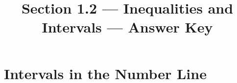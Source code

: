 

\title{Section 1.2 --- Inequalities and Intervals --- Answer Key}

\newcommand{\sets}{\ensuremath{\mathbb{N}\quad\mathbb{Z}\quad\mathbb{Q}\quad\mathbb{R}}}
\newcommand{\picksets}[1]{$#1\hfill\sets\qquad$}


\maketitle

\section*{Intervals in the Number Line}
\begin{senum}
\item {}
\item \twopartans{$-4\leq x<4$}{$[-4,\infty)$}
\item {}
\item {}
\item \twopartans{$x\leq -3$}{$(-\infty,-3]$}
\item \twopartans{$x\geq 2$}{$[2,\infty)$}
\item \twopartans{$-5<x\leq -3$}{$(-5,-3]$}
\item {}
\end{senum}

